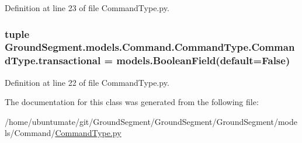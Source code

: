 Definition at line 23 of file Command\+Type.\+py.

\hypertarget{class_ground_segment_1_1models_1_1_command_1_1_command_type_1_1_command_type_af3841a569f6313e9569098e30655306d}{}
\subsubsection[{transactional}]{\setlength{\rightskip}{0pt plus 5cm}tuple Ground\+Segment.\+models.\+Command.\+Command\+Type.\+Command\+Type.\+transactional = models.\+Boolean\+Field(default=False)\hspace{0.3cm}{\ttfamily [static]}}\label{class_ground_segment_1_1models_1_1_command_1_1_command_type_1_1_command_type_af3841a569f6313e9569098e30655306d}


Definition at line 22 of file Command\+Type.\+py.



The documentation for this class was generated from the following file\+:\begin{DoxyCompactItemize}
\item 
/home/ubuntumate/git/\+Ground\+Segment/\+Ground\+Segment/\+Ground\+Segment/models/\+Command/\hyperlink{_command_type_8py}{Command\+Type.\+py}\end{DoxyCompactItemize}
